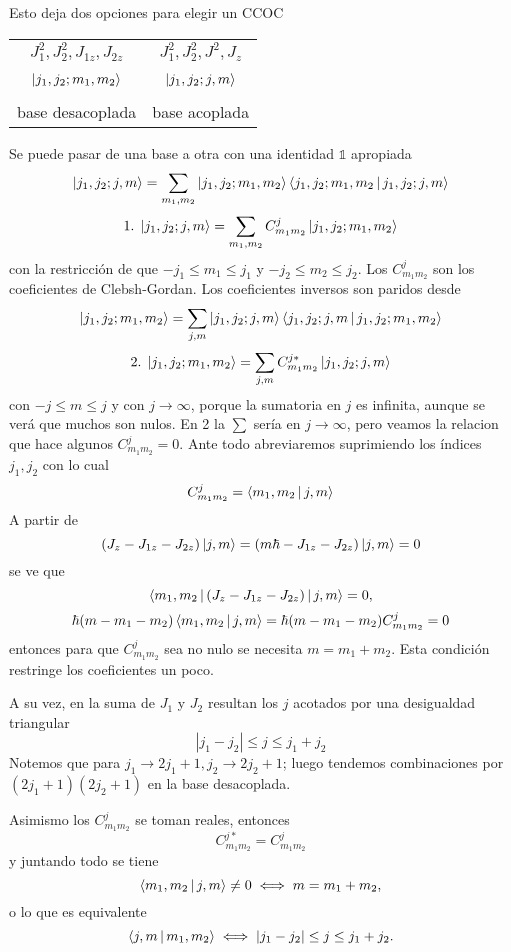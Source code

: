 \documentclass[10pt,oneside]{CBFT_book}
\begin{document}
Esto deja dos opciones para elegir un CCOC

\begin{center}
\begin{tabular}{|c|c|}
\hline 
$J_1^2, J_2^2, J_{1z}, J_{2z}$ & $J_1^2, J_2^2, J^2, J_{z}$ \\
& \\
$\Ket{j_1,j_2;m_1,m_2}$ & $\Ket{j_1,j_2;j,m}$ \\
& \\
base desacoplada & base acoplada \\
\hline
\end{tabular}
\end{center}

Se puede pasar de una base a otra con una identidad $\mathbb{1}$ apropiada
\[
	\Ket{j_1,j_2;j,m} = \sum_{m_1,m_2} \Ket{j_1,j_2;m_1,m_2}\Braket{j_1,j_2;m_1,m_2|j_1,j_2;j,m}
\]
\[
	1. \; \Ket{j_1,j_2;j,m} = \sum_{m_1,m_2} C_{m_1m_2}^j \Ket{j_1,j_2;m_1,m_2}
\]
con la restricción de que $-j_1 \leq m_1 \leq j_1$ y $-j_2 \leq m_2 \leq j_2$.
Los $C_{m_1 m_2}^j$ son los coeficientes de Clebsh-Gordan. 
Los coeficientes inversos son paridos desde 
\[
	\Ket{j_1,j_2;m_1,m_2} = \sum_{j,m} \Ket{j_1,j_2;j,m}\Braket{j_1,j_2;j,m|j_1,j_2;m_1,m_2}
\]
\[
	2. \; \Ket{j_1,j_2;m_1,m_2} = \sum_{j,m} C_{m_1m_2}^{j*}\Ket{j_1,j_2;j,m}
\]
con $-j \leq m \leq j$ y con $j\to\infty$, porque la sumatoria en $j$ es infinita, aunque se verá
que muchos son nulos.
En 2 la $\sum$ sería en $j\to\infty$, pero veamos la relacion que hace algunos $C_{m_1 m_2}^j=0$. 
Ante todo abreviaremos suprimiendo los índices $j_1,j_2$ con lo cual 
\[
	C_{m_1m_2}^{j} = \Braket{m_1,m_2|j,m}
\]
A partir de
\[
	(J_{z} - J_{1z} - J_{2z})\Ket{j,m} = (m\hbar - J_{1z} - J_{2z})\Ket{j,m} = 0
\]
se ve que
\[
	\Braket{m_1,m_2|(J_{z} - J_{1z} - J_{2z})|j,m}= 0, 
\]
\[
	\hbar(m-m_1-m_2)\Braket{m_1,m_2|j,m} = \hbar(m-m_1-m_2) C^j_{m_1 m_2} = 0
\]
entonces para que $C^j_{m_1 m_2}$ sea no nulo se necesita $m = m_1 + m_2$.
Esta condición restringe los coeficientes un poco.

A su vez, en la suma de $J_1$ y $J_2$ resultan los $j$ acotados por una desigualdad triangular 
\[
	|j_1 - j_2| \leq j \leq j_1 + j_2
\]
Notemos que para $j_1 \to 2 j_1 + 1, j_2 \to 2j_2 + 1$; luego tendemos combinaciones por 
$(2 j_1 + 1)(2 j_2 + 1)$ en la base desacoplada.

Asimismo los $C_{m_1 m_2}^j$ se toman reales, entonces 
\[
	C_{m_1m_2}^{j*} = C_{m_1m_2}^{j}
\]
y juntando todo se tiene 
\[
	\Braket{m_1,m_2|j,m} \neq 0	\iff  m = m_1 + m_2,
\]
o lo que es equivalente
\[
	\Braket{j,m|m_1,m_2} \iff |j_1 - j_2| \leq j \leq j_1 + j_2.
\]
\end{document}
